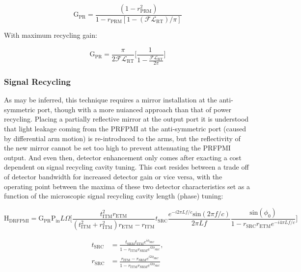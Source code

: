 \begin{equation}
	\mathrm{G_{PR}} = \frac{(1-r_\mathrm{PRM}^2)}{1-r_\mathrm{PRM}[1- (\mathscr{F} \mathscr{L}_\mathrm{RT})/ \pi]}
\end{equation}

\noindent With maximum recycling gain: 

\begin{equation}
	\mathrm{G_{PR}} = \frac{\pi}{2 \mathscr{F} \mathscr{L}_\mathrm{RT}} \bigg[ \frac{1}{1- \frac{ \mathscr{F} \mathscr{L}_\mathrm{RT}}{ 2 \pi}} \bigg]
\end{equation}

\subsubsection{Signal Recycling}
As may be inferred, this technique requires a mirror installation at the anti-symmetric port, though with a more nuianced approach than that of power recycling. Placing a partially reflective mirror at the output port it is understood that light leakage coming from the PRFPMI at the anti-symmetric port (caused by differential arm motion) is re-introduced to the arms, but the reflectivity of the new mirror cannot be set too high to prevent attenuating the PRFPMI output. And even then, detector enhancement only comes after exacting a cost dependent on signal recycling cavity tuning. This cost resides between a trade off of detector bandwidth for increased detector gain or vice versa, with the operating point between the maxima of these two detector characteristics set as a function of the microscopic signal recycling cavity length (phase) tuning:

\begin{equation}
	\mathrm{H}_\mathrm{DRFPMI} = \mathrm{G}_\mathrm{PR} \mathrm{P}_\mathrm{in} L \Omega \bigg[ \frac{ t_\mathrm{ITM}^2 r_\mathrm{ETM}}{(t_\mathrm{ITM}^2 + r_\mathrm{ITM}^2)r_\mathrm{ETM} - r_\mathrm{ITM}}  t_\mathrm{SRC} \frac{e^{-i 2 \pi L f / c} \mathrm{sin}( 2 \pi f / c)}{ 2 \pi L f } \frac{\mathrm{sin}(\phi_0)}{1- r_\mathrm{SRC}r_\mathrm{ETM} e^{-i 4 \pi L f / c}} \bigg]
\end{equation}

\begin{align}
	t_\mathrm{SRC} & = \frac{t_\mathrm{SRM} t_\mathrm{ITM} e^{i\phi_\mathrm{SRC}}}{1-r_\mathrm{ITM} r_\mathrm{SRM} e^{i2\phi_\mathrm{SRC}}}, \\
	r_\mathrm{SRC} & = \frac{r_\mathrm{ITM} - r_\mathrm{SRM} e^{i2\phi_\mathrm{SRC}}}{1-r_\mathrm{ITM} r_\mathrm{SRM} e^{i2\phi_\mathrm{SRC}}} 
\end{align}

